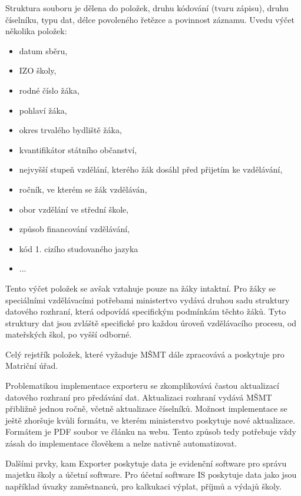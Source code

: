 \documentclass[FM,Proj]{tulthesis}
\begin{document}
Struktura souboru je dělena do položek, druhu kódování (tvaru zápisu),
druhu číselníku, typu dat, délce povoleného řetězce a povinnost záznamu.
 Uvedu výčet několika položek: %
\begin{itemize}
    \item datum sběru,
    \item IZO školy,
    \item rodné číslo žáka,
    \item pohlaví žáka,
    \item okres trvalého bydliště žáka,
    \item kvantifikátor státního občanství,
    \item nejvyšší stupeň vzdělání, kterého žák dosáhl před přijetím ke vzdělávání,
    \item ročník, ve kterém se žák vzděláván,
    \item obor vzdělání ve střední škole,
    \item způsob financování vzdělávání,
    \item kód 1. cizího studovaného jazyka
    \item ...
\end{itemize}
Tento výčet položek se avšak vztahuje pouze na žáky intaktní. Pro žáky se speciálními vzdělávacími
potřebami ministertvo vydává druhou sadu struktury datového rozhraní, která odpovídá specifickým
podmínkám těchto žáků. Tyto struktury dat jsou zvláště specifické pro každou úroveň vzdělávacího procesu,
od mateřských škol, po vyšší odborné.

Celý rejstřík položek, které vyžaduje MŠMT dále zpracovává a poskytuje pro Matriční úřad.

Problematikou implementace exporteru se zkomplikovává častou aktualizací datového rozhraní
pro předávání dat. Aktualizaci rozhraní vydává MŠMT přibližně jednou ročně, včetně aktualizace
číselníků\cite{msmt-rozhrani-predavani-dat-2023}. Možnost implementace se ještě zhoršuje kvůli formátu,
ve kterém ministerstvo poskytuje nové aktualizace. Formátem je PDF soubor ve článku na webu. Tento 
způsob tedy potřebuje vždy zásah do implementace člověkem a nelze nativně automatizovat.

Dalšími prvky, kam Exporter poskytuje data je evidenční software pro správu majetku školy a 
účetní software. Pro účetní software IS poskytuje data jako jsou například úvazky zaměstnanců,
pro kalkukaci výplat, příjmů a výdajů školy.

\end{document}
